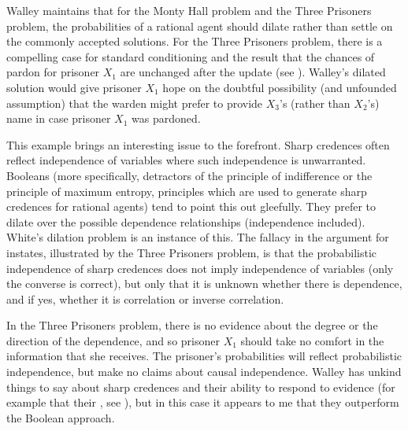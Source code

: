 \documentclass[11pt]{article}
\begin{document}
Walley maintains that for the Monty Hall problem and the Three Prisoners problem, the probabilities of a rational agent should dilate rather than settle on the commonly accepted solutions. For the Three Prisoners problem, there is a compelling case for standard conditioning and the result that the chances of pardon for prisoner $X_{1}$ are unchanged after the update (see ). Walley's dilated solution would give prisoner $X_{1}$ hope on the doubtful possibility (and unfounded assumption) that the warden might prefer to provide $X_{3}$'s (rather than $X_{2}$'s) name in case prisoner $X_{1}$ was pardoned.

This example brings an interesting issue to the forefront. Sharp credences often reflect independence of variables where such independence is unwarranted. Booleans (more specifically, detractors of the principle of indifference or the principle of maximum entropy, principles which are used to generate sharp credences for rational agents) tend to point this out gleefully. They prefer to dilate over the possible dependence relationships (independence included). White's dilation problem is an instance of this. The fallacy in the argument for instates, illustrated by the Three Prisoners problem, is that the probabilistic independence of sharp credences does not imply independence of variables (only the converse is correct), but only that it is unknown whether there is dependence, and if yes, whether it is correlation or inverse correlation.

In the Three Prisoners problem, there is no evidence about the degree or the direction of the dependence, and so prisoner $X_{1}$ should take no comfort in the information that she receives. The prisoner's probabilities will reflect probabilistic independence, but make no claims about causal independence. Walley has unkind things to say about sharp credences and their ability to respond to evidence (for example that their , see ), but in this case it appears to me that they outperform the Boolean approach.

\end{document}
